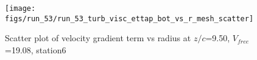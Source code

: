 \begin{figure}[H]
\centering
\texttt{[image: figs/run\_53/run\_53\_turb\_visc\_ettap\_bot\_vs\_r\_mesh\_scatter]}
\caption{Scatter plot of velocity gradient term vs radius at $z/c$=9.50, $V_{free}$=19.08, station6}
\label{fig:run_53_turb_visc_ettap_bot_vs_r_mesh_scatter}
\end{figure}


